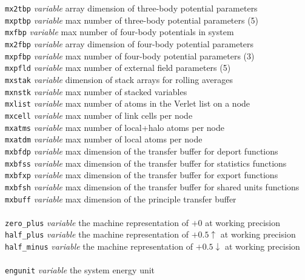 \begin{tabbing}
\> {\tt mx2tbp}      \> {\em variable}       \> array dimension of three-body potential parameters \\
\> {\tt mxptbp}      \> {\em variable}       \> max number of three-body potential parameters (5) \\
\> {\tt mxfbp}       \> {\em variable}       \> max number of four-body potentials in system \\
\> {\tt mx2fbp}      \> {\em variable}       \> array dimension of four-body potential parameters \\
\> {\tt mxpfbp}      \> {\em variable}       \> max number of four-body potential parameters (3) \\
\> {\tt mxpfld}      \> {\em variable}       \> max number of external field parameters (5) \\
\> {\tt mxstak}      \> {\em variable}       \> dimension of stack arrays for rolling averages \\
\> {\tt mxnstk}      \> {\em variable}       \> max number of stacked variables \\
\> {\tt mxlist}      \> {\em variable}       \> max number of atoms in the Verlet list on a node \\
\> {\tt mxcell}      \> {\em variable}       \> max number of link cells per node \\
\> {\tt mxatms}      \> {\em variable}       \> max number of local+halo atoms per node \\
\> {\tt mxatdm}      \> {\em variable}       \> max number of local atoms per node \\
\> {\tt mxbfdp}      \> {\em variable}       \> max dimension of the transfer buffer for deport functions \\
\> {\tt mxbfss}      \> {\em variable}       \> max dimension of the transfer buffer for statistics functions \\
\> {\tt mxbfxp}      \> {\em variable}       \> max dimension of the transfer buffer for export functions \\
\> {\tt mxbfsh}      \> {\em variable}       \> max dimension of the transfer buffer for shared units functions \\
\> {\tt mxbuff}      \> {\em variable}       \> max dimension of the principle transfer buffer \\
\>                   \>                      \> \\
\> {\tt zero\_plus}  \> {\em variable}       \> the machine representation of $+0$ at working precision \\
\> {\tt half\_plus}  \> {\em variable}       \> the machine representation of $+0.5\uparrow$ at working precision \\
\> {\tt half\_minus} \> {\em variable}       \> the machine representation of $+0.5\downarrow$ at working precision \\
\>                   \>                      \> \\
\> {\tt engunit}     \> {\em variable}       \> the system energy unit \\
\end{tabbing}

